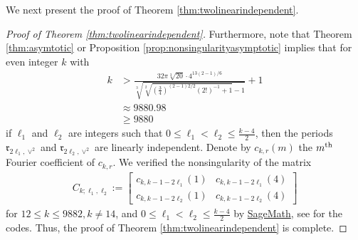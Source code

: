 \documentclass[11pt,letterpaper,reqno]{amsart}
\numberwithin{figure}{section}
\numberwithin{table}{section}
\theoremstyle{definition}
\theoremstyle{plain}
\theoremstyle{definition}
\theoremstyle{definition}
\theoremstyle{remark}
\numberwithin{equation}{section}
\theoremstyle{remark}
\begin{document}
We next present the proof of Theorem \ref{thm:twolinearindependent}.
\begin{proof}[Proof of Theorem \ref{thm:twolinearindependent}]Furthermore, note that Theorem \ref{thm:asymtotic} or Proposition \ref{prop:nonsingularityasymptotic} implies that for even integer $k$ with
\begin{align}
    k&>\frac{32\pi\sqrt[3]{20}\cdot4^{13(2-1)/6}}{\sqrt[3]{\sqrt[2]{\left(\frac{3}{4}\right)^{(2-1)2/2}(2!)^{-1}+1}-1}}+1\\&\approx9880.98\\&\geq9880
\end{align}
if $\ell_1$ and $\ell_2$ are integers such that $0\leq\ell_1<\ell_2\leq\frac{k-4}{2}$, then the periods $\mathfrak{r}_{2\ell_1,\vee^2}$ and $\mathfrak{r}_{2\ell_2,\vee^2}$ are linearly independent. Denote by $c_{k,r}(m)$ the $m^{\rm th}$ Fourier coefficient of $c_{k,r}$. We verified the nonsingularity of the matrix 
\begin{align}C_{k;\ell_1,\ell_2}:=
\begin{bmatrix}
    c_{k,k-1-2\ell_1}(1) & c_{k,k-1-2\ell_1}(4)\\c_{k,k-1-2\ell_2}(1) & c_{k,k-1-2\ell_2}(4)
\end{bmatrix}    \label{eq:matrixcononormalization}
\end{align}
for $12\leq k\leq 9882, k\neq 14$, and $0\leq\ell_1<\ell_2\leq\frac{k-4}{2}$ by \href{https://www.sagemath.org}{SageMath}, see \cite{githubNi} for the codes. Thus, the proof of Theorem \ref{thm:twolinearindependent} is complete. 
\end{proof}
\end{document}
